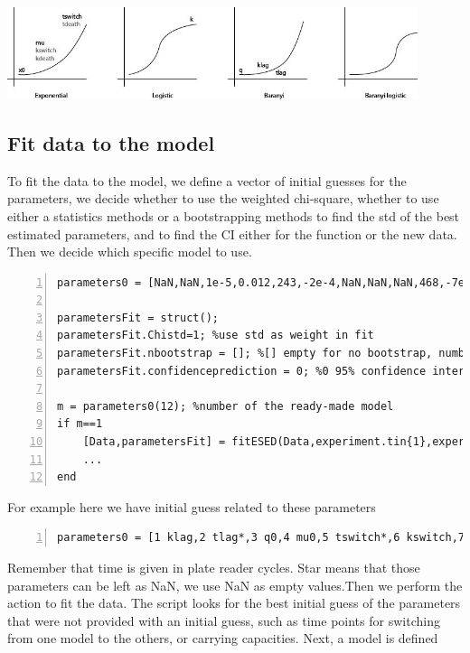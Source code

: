 \documentclass{article}
\begin{document}
\begin{center}
\includegraphics[width=0.9\textwidth]{models}
\end{center}

\subsection{Fit data to the model}
To fit the data to the model, we define a vector of initial guesses for the parameters, we decide whether to use the weighted chi-square, whether to use either a statistics methods or a bootstrapping methods to find the std of the best estimated parameters, and to find the CI either for the function or the new data. Then we decide which specific model to use.
\begin{lstlisting}[frame=single,numbers=left,style=Matlab-Pyglike]
parameters0 = [NaN,NaN,1e-5,0.012,243,-2e-4,NaN,NaN,NaN,468,-7e-5,1,NaN,NaN,NaN,NaN]; %initial guess

parametersFit = struct();
parametersFit.Chistd=1; %use std as weight in fit
parametersFit.nbootstrap = []; %[] empty for no bootstrap, number for n of bootstraps %boostrap to find error on fit parameters
parametersFit.confidenceprediction = 0; %0 95% confidence interval of fit function, 1 95% of finding new data in the interval

m = parameters0(12); %number of the ready-made model
if m==1
    [Data,parametersFit] = fitESED(Data,experiment.tin{1},experiment.tfin{1},parameters0,expN,parametersFit); %exp+saturation - exp - exp death
    ...
end
\end{lstlisting}
For example here we have initial guess related to these parameters
\begin{lstlisting}[frame=single,numbers=left,style=Matlab-Pyglike]
parameters0 = [1 klag,2 tlag*,3 q0,4 mu0,5 tswitch*,6 kswitch,7 ks--,8 t--,9 k--,10 tdeath*,11 kdeath,12 m ,13 x0*, 14 k*, 15 k2*, 16 k3*];
\end{lstlisting}
Remember that time is given in plate reader cycles. Star means that those parameters can be left as NaN, we use NaN as empty values.Then we perform the action to fit the data. The script looks for the best initial guess of the parameters that were not provided with an initial guess, such as time points for switching from one model to the others, or carrying capacities. Next, a model is defined
\end{document}
